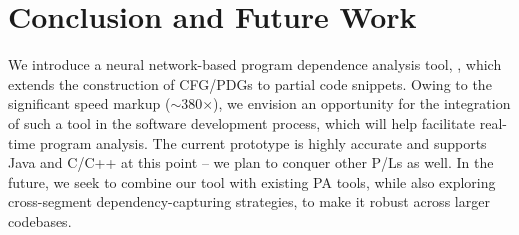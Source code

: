 \section{Conclusion and Future Work}
We introduce a neural network-based program dependence analysis tool, \tool, which extends the construction of CFG/PDGs to partial code snippets. Owing to the significant speed markup ($\sim$380$\times$), we envision an opportunity for the integration of such a tool in the software development process, which will help facilitate real-time program analysis. 
The current prototype is highly accurate and supports Java and C/C++ at this point -- we plan to conquer other 
P/Ls
as well. In the future, we seek to combine our tool with existing PA tools, while also exploring cross-segment dependency-capturing strategies, to make it robust across larger codebases. 
